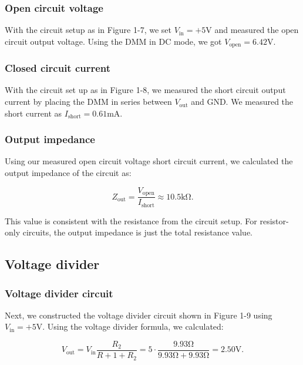 \documentclass{article}
\begin{document}
\subsubsection{Open circuit voltage}

With the circuit setup as in Figure 1-7, we set $V_\text{in}=+5\si{\volt}$ and
measured the open circuit output voltage. Using the DMM in DC mode, we got 
$V_\text{open}=6.42\si{\volt}$.

\subsubsection{Closed circuit current}

With the circuit set up as in Figure 1-8, we measured the short circuit output
current by placing the DMM in series between $V_\text{out}$ and GND. We measured
the short current as $I_\text{short}=0.61\si{\milli\ampere}$.

\subsubsection{Output impedance}

Using our measured open circuit voltage short circuit current, we calculated
the output impedance of the circuit as:

\begin{equation}
    Z_\text{out}=\frac{V_\text{open}}{I_\text{short}}\approx10.5\si{\kilo\ohm}.
\end{equation}

\noindent This value is consistent with the resistance from the circuit setup. For
resistor-only circuits, the output impedance is just the total resistance value.


\subsection{Voltage divider}

\subsubsection{Voltage divider circuit}

Next, we constructed the voltage divider circuit shown in Figure 1-9 using 
$V_\text{in}=+5\si{\volt}$. Using the voltage divider formula, we calculated:

\begin{equation}
    V_\text{out}=V_\text{in}\frac{R_2}{R+1+R_2}=5\cdot\frac{9.93\si{\ohm}}{9.93\si{\ohm}+9.93\si{\ohm}}=2.50\si{\volt}.
\end{equation}
\end{document}
